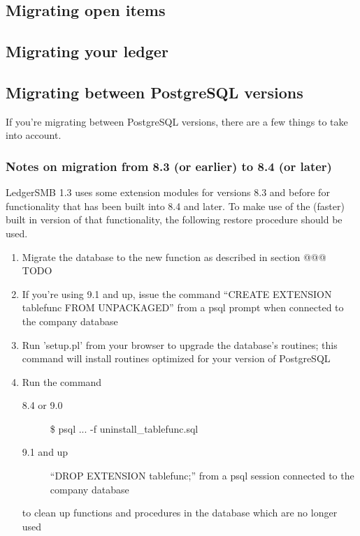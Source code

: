 \subsection{Migrating open items}
\subsection{Migrating your ledger}

\subsection{Migrating between PostgreSQL versions}

If you're migrating between PostgreSQL versions, there are a few things to take
into account.


\subsubsection{Notes on migration from 8.3 (or earlier) to 8.4 (or later)}



LedgerSMB 1.3 uses some extension modules for versions 8.3 and before for functionality
that has been built into 8.4 and later. To make use of the (faster) built in version
of that functionality, the following restore procedure should be used.

\begin{enumerate}
\item Migrate the database to the new function as described in section @@@ TODO
\item If you're using 9.1 and up, issue the command ``CREATE EXTENSION tablefunc FROM UNPACKAGED''
   from a psql prompt when connected to the company database
\item Run 'setup.pl' from your browser to upgrade the database's routines; this command will
   install routines optimized for your version of PostgreSQL
\item Run the command
	\begin{description}
	\item [8.4 or 9.0] \$ psql ... -f uninstall\_tablefunc.sql
	\item [9.1 and up] ``DROP EXTENSION tablefunc;'' from a psql session connected
		to the company database
	\end{description}
	to clean up functions and procedures in the database which are no longer used
\end{enumerate}


